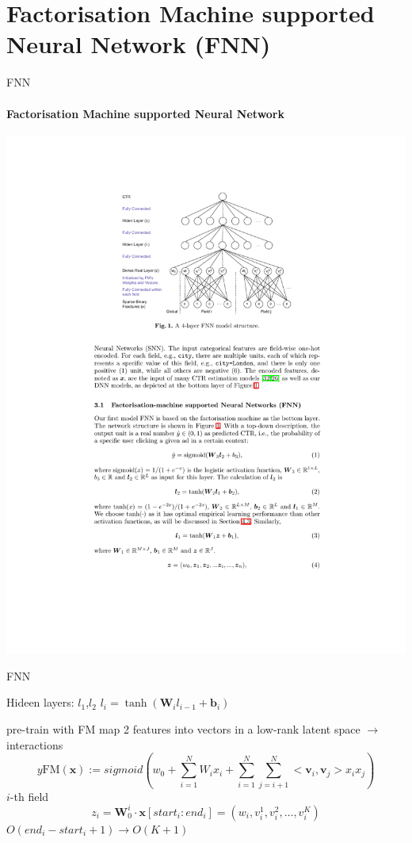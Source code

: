 \documentclass{ctexbeamer}
\begin{document}
	\section{Factorisation Machine supported Neural Network (FNN)}
\begin{frame}{FNN}
	\framesubtitle{Factorisation Machine supported Neural Network }
	\begin{center}
		\includegraphics[width=.85\textwidth]{framework/fnn}
	\end{center}
\end{frame}

\begin{frame}{FNN}
	\begin{block}{Hideen layers: $l_1$,$l_2$}
		$l_i = \tanh (\mathbf{W}_i l_{i-1} + \mathbf{b}_i)$
	\end{block}

	\begin{block}{pre-train with FM}
		map 2 features into vectors in a low-rank latent space $\to$ interactions
		$$y \text{FM}({\mathbf{x}}) := sigmoid(w_0 + \sum_{i=1}^{N}{W_i x_i}
		 + \sum_{i=1}^{N}{\sum_{j=i+1}^{N}{<\mathbf{v}_i,\mathbf{v}_j> x_i x_j}})$$
		 $i$-th field
		 $$z_i = \mathbf{W}_0^i \cdot \mathbf{x}[start_i : end_i] = (w_i,v_i^1,v_i^2,\ldots,v_i^K)$$
	$O(end_i - start_i+1) \to O(K+1)$
	\end{block}
\end{frame}
\end{document}
